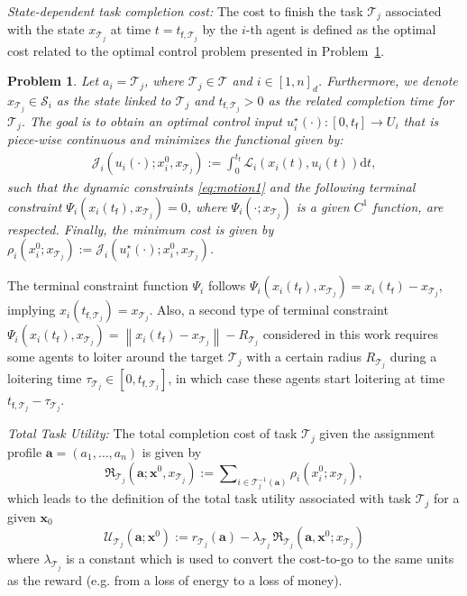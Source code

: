\documentclass{ifacconf}
\newcommand{\ud}{\mathrm{d}}
\newcommand{\f}{{\mathsf{f}}}
\newcommand{\cJ}{\mathcal{J}}
\newcommand{\cL}{\mathcal{L}}
\newcommand{\cR}{\mathfrak{R}}
\newcommand{\cS}{\mathcal{S}}
\newcommand{\cT}{\mathcal{T}}
\newcommand{\cU}{\mathcal{U}}
\newtheorem{problem}{Problem}
\newcommand{\norm}[1]{\left\lVert#1\right\rVert}
\begin{document}
\noindent \textit{State-dependent task completion cost:} The cost to finish the task $\cT_j$ associated with the state $x_{\cT_j}$ at time $t=t_{\f,\cT_j}$ by the $i$-th agent is defined as the optimal cost related to the optimal control problem presented in Problem~\ref{problemOCP}.
\begin{problem}\label{problemOCP}
Let $a_i = \cT_j$, where $\cT_j \in \cT$ and $i \in [1,n]_d$. Furthermore, we denote $x_{\cT_j} \in \cS_i$ as the state linked to $\cT_j$ and $t_{\f,\cT_j}>0$ as the related completion time for $\cT_j$. The goal is to obtain an optimal control input $u_i^{\star}(\cdot): [0,t_\f] \rightarrow U_i$ that is piece-wise continuous and minimizes the functional given by:
\begin{align}\label{eq:cost}
\cJ_i(u_i(\cdot); x_i^0, x_{\cT_j}) 
:= \int_0^{t_\f} \cL_i(x_i(t), u_i(t)) \ud t,
\end{align}
such that the dynamic constraints \eqref{eq:motion1} and the following terminal constraint $\Psi_i( x_i(t_\f), x_{\cT_j} ) = 0$, where $\Psi_i(\cdot; x_{\cT_j})$ is a given $C^1$ function, are respected. Finally, the minimum cost is given by $\rho_i(x_i^0; x_{\cT_j}) := \cJ_i(u_i^{\star}(\cdot);x_i^0, x_{\cT_j})$. 
\end{problem}
\begin{remark}
The terminal constraint function $\Psi_i$ follows $\Psi_i( x_i(t_\f), x_{\cT_j} ) = x_i(t_\f) - x_{\cT_j}$, implying $x_i(t_{\f,\cT_j}) = x_{\cT_j}$. 
Also, a second type of terminal constraint $\Psi_i( x_i(t_\f), x_{\cT_j} ) = \norm{x_i(t_\f) - x_{\cT_j}} - R_{\cT_j}$ considered in this work requires some agents to loiter around the target $\cT_j$ with a certain radius $R_{\cT_j}$
during a loitering time $\tau_{\cT_j} \in [0, t_{\f,\cT_j}]$, in which case these agents start loitering at time $t_{\f,\cT_j} - \tau_{\cT_j}$.
\end{remark}


\noindent \textit{Total Task Utility:} The total completion cost of task $\cT_j$ given the assignment profile $\bm{a} = (a_1, \dots, a_n)$ is given by %
\begin{equation}
\cR_{\cT_j}(\bm{a};\bm{x}^0, x_{\cT_j}) := \sum\nolimits_{i \in \cT^{-1}_j(\bm{a}) } \rho_i(x_i^0; x_{\cT_j}),
\end{equation}
which leads to the definition of the total task utility associated with task $\cT_j$ for a given $\bm{x}_0$
\begin{equation}
\cU_{\cT_j}(\bm{a};\bm{x}^0) := r_{\cT_j}(\bm{a}) - \lambda_{\cT_j} \, \cR_{\cT_j}(\bm{a},\bm{x}^0; x_{\cT_j})
\end{equation}
where $\lambda_{\cT_j}$ is a constant which is used to convert the cost-to-go to the same units as the reward (e.g. from a loss of energy to a loss of money).
\end{document}
